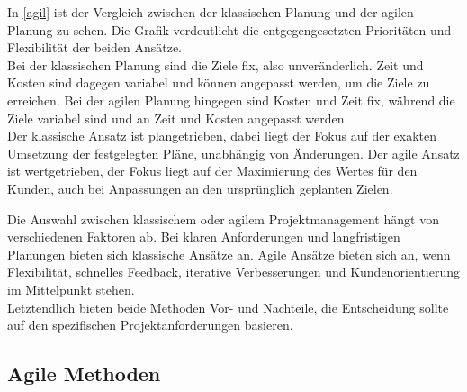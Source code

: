 \documentclass[ngerman]{seminarvorlage}
\begin{document}
In \autoref{agil} ist der Vergleich zwischen der klassischen Planung und der agilen Planung zu sehen. Die Grafik verdeutlicht die entgegengesetzten Prioritäten und Flexibilität der beiden Ansätze.\\ Bei der klassischen Planung sind die Ziele fix, also unveränderlich. Zeit und Kosten sind dagegen variabel und können angepasst werden, um die Ziele zu erreichen. Bei der agilen Planung hingegen sind Kosten und Zeit fix, während die Ziele variabel sind und an Zeit und Kosten angepasst werden.\\  Der klassische Ansatz ist plangetrieben, dabei liegt der Fokus auf der exakten Umsetzung der festgelegten Pläne, unabhängig von Änderungen. Der agile Ansatz ist wertgetrieben, der Fokus liegt auf der Maximierung des Wertes für den Kunden, auch bei Anpassungen an den ursprünglich geplanten Zielen.

Die Auswahl zwischen klassischem oder agilem Projektmanagement hängt von verschiedenen Faktoren ab. Bei klaren Anforderungen und langfristigen Planungen bieten sich klassische Ansätze an. Agile Ansätze bieten sich an, wenn Flexibilität, schnelles Feedback, iterative Verbesserungen und Kundenorientierung im Mittelpunkt stehen.\\ Letztendlich bieten beide Methoden Vor- und Nachteile, die Entscheidung sollte auf den spezifischen Projektanforderungen basieren.

\subsection {Agile Methoden}
\end{document}
